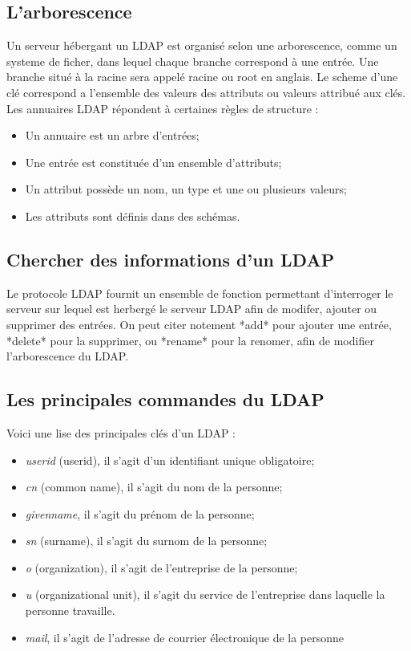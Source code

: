 \subsection{L'arborescence}
Un serveur hébergant un LDAP est organisé selon une arborescence, comme un systeme de ficher, dans lequel chaque branche correspond à une entrée. Une branche situé à la racine sera appelé racine ou root en anglais. Le scheme d'une clé correspond a l'ensemble des valeurs des attributs ou valeurs attribué aux clés.
Les annuaires LDAP répondent à certaines règles de structure :
\begin{itemize}
    \item Un annuaire est un arbre d'entrées;
    \item Une entrée est constituée d'un ensemble d'attributs;
    \item Un attribut possède un nom, un type et une ou plusieurs valeurs;
    \item Les attributs sont définis dans des schémas.
\end{itemize}
\subsection{Chercher des informations d'un LDAP}
Le protocole LDAP fournit un ensemble de fonction permettant d'interroger le serveur sur lequel est herbergé le serveur LDAP afin de modifer, ajouter ou supprimer des entrées. On peut citer notement *add* pour ajouter une entrée, *delete* pour la supprimer, ou *rename* pour la renomer, afin de modifier l'arborescence du LDAP.
\subsection{Les principales commandes du LDAP}
Voici une lise des principales clés d'un LDAP :
\begin{itemize}
    \item \textit{userid} (userid), il s'agit d'un identifiant unique obligatoire;
    \item \textit{cn} (common name), il s'agit du nom de la personne;
    \item \textit{givenname}, il s'agit du prénom de la personne;
    \item \textit{sn} (surname), il s'agit du surnom de la personne;
    \item \textit{o} (organization), il s'agit de l'entreprise de la personne;
    \item \textit{u} (organizational unit), il s'agit du service de l'entreprise dans laquelle la personne travaille.
    \item \textit{mail}, il s'agit de l'adresse de courrier électronique de la personne
\end{itemize}


